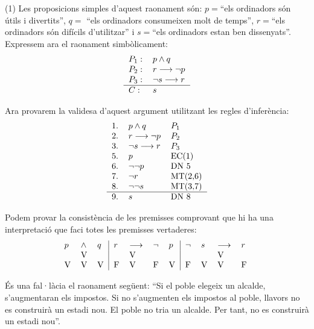 \begin{solucio}
(1) Les proposicions simples d'aquest raonament són: $p=$\enquote{els ordinadors són útils i divertits}, $q=$%
\enquote{els ordinadors consumeixen molt de temps},
$r=$\enquote{els ordinadors són difícils d'utilitzar} i
$s=$\enquote{els ordinadors estan ben dissenyats}.
Expressem ara el raonament simbòlicament:%
\[%
\begin{tabular}
[c]{ll}%
$P_{1}:$ & $p\wedge q$\\
$P_{2}:$ & $r\longrightarrow\lnot p$\\
$P_{3}:$ & $\lnot s\longrightarrow r$\\\hline
$C:$ & $s$%
\end{tabular}
\]


Ara provarem la validesa d'aquest argument utilitzant les regles
d'inferència:%
\[%
\begin{tabular}
[c]{lll}%
1. & $p\wedge q$ & $P_{1}$\\
2. & $r\longrightarrow\lnot p$ & $P_{2}$\\
3. & $\lnot s\longrightarrow r$ & $P_{3}$\\
5. & $p$ & EC(1)\\
6. & $\lnot\lnot p$ & DN 5\\
7. & $\lnot r$ & MT(2,6)\\
8. & $\lnot\lnot s$ & MT(3,7)\\\hline
9. & $s$ & DN 8
\end{tabular}
\]


Podem provar la consistència de les premisses comprovant que hi ha una
interpretació que faci totes les premisses vertaderes:%
\[%
\begin{tabular}
[c]{lll|llll|llll}%
$p$ & $\wedge$ & $q$ & $r$ & $\longrightarrow$ & $\lnot$ & $p$ & $\lnot$ & $s$
& $\longrightarrow$ & $r$\\
& V &  &  & V &  &  &  &  & V & \\
V & V & V & F & V & F & V & F & V & V & F
\end{tabular}
\
\]

\end{solucio}

\begin{exercici}
És una fal·làcia el raonament següent:
\enquote{Si el poble elegeix un alcalde, s'augmentaran els impostos.
Si no s'augmenten els impostos al poble, llavors no es construirà un
estadi nou. El poble no tria un alcalde. Per tant, no es construirà un
estadi nou}.
\end{exercici}

